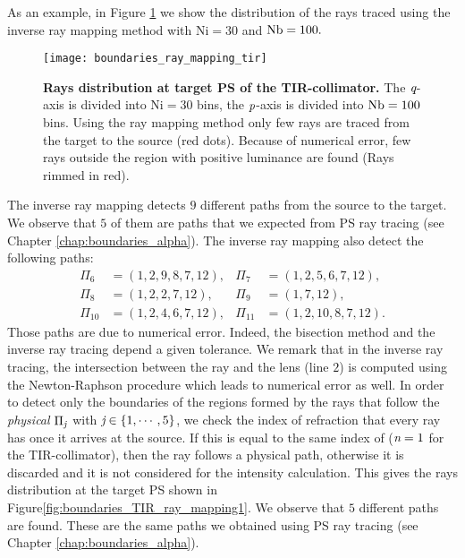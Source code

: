 As an example, in Figure \ref{fig:boundaries_TIR_ray_mapping} we show the distribution of the rays traced using the inverse ray mapping method with $\textrm{Ni}=30$ and $\textrm{Nb} = 100.$ 
\begin{figure}[h]
  \begin{center}
  \texttt{[image: boundaries\_ray\_mapping\_tir]}
  \end{center}
  \caption{\textbf{Rays distribution at target PS of the TIR-collimator.}
 The $\textit{q}$-axis is divided into $\textrm{Ni}=30$ bins, the $\textit{p}$-axis is divided into $\textrm{Nb} = 100$ bins. Using the ray mapping method only few rays are traced from the target to the source (red dots). Because of numerical error, few rays outside the region with positive luminance are found (Rays rimmed in red).}
\label{fig:boundaries_TIR_ray_mapping}
 \end{figure}
The inverse ray mapping detects $9$ different paths from the source to the target. 
We observe that $5$ of them are paths that we expected from PS ray tracing (see Chapter \ref{chap:boundaries_alpha}). 
The inverse ray mapping also detect the following paths:
\begin{equation}
\begin{array}{llll}
\Pi_6&=(1,2,9,8,7,12), & \Pi_7&=(1,2,5,6,7,12), \\
\Pi_8&=(1,2,2,7,12),& \Pi_9&=(1,7,12),\\
\Pi_{10}&=(1,2,4,6,7,12),& \Pi_{11}&=(1,2,10,8,7,12).
\end{array}\end{equation}
Those paths are due to numerical error. Indeed, the bisection method and the inverse ray tracing depend a given tolerance. We remark that in the inverse ray tracing, the intersection between the ray and the lens (line $2$) is computed using the Newton-Raphson procedure which leads to numerical error as well.
In order to detect only the boundaries of the regions formed by the rays that follow the \textit{physical} $\Pi_{\textit{j}}$ with $\textit{j}\in\{1, \cdots, 5\}$, we check the index of refraction that every ray has once it arrives at the source.
If this is equal to the same index of  ($\textit{n}=1$ for the TIR-collimator), then the ray follows a physical path, otherwise it is discarded and it is not considered for the intensity calculation. This gives the rays distribution at the target PS shown in Figure\ref{fig:boundaries_TIR_ray_mapping1}. We observe that $5$ different paths are found. These are the same paths we obtained using PS ray tracing (see Chapter \ref{chap:boundaries_alpha}).

